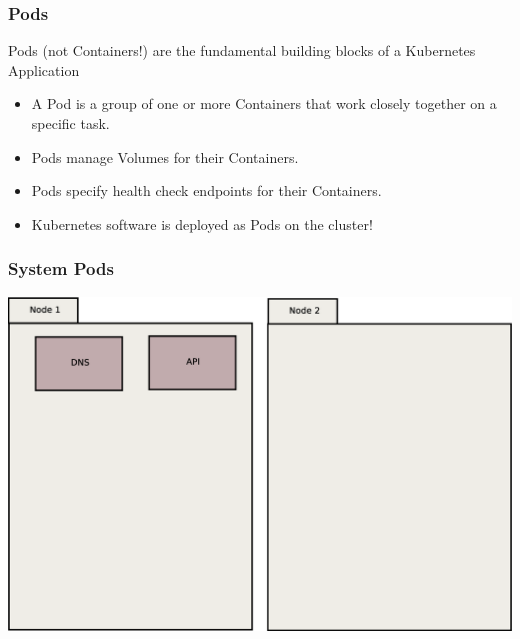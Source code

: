     \begin{frame}
        \frametitle{Pods}
        Pods (not Containers!) are the fundamental building blocks of a Kubernetes Application\pause
        \begin{itemize}
            \item A Pod is a group of one or more Containers that work closely together on a specific task.\pause
            \item Pods manage Volumes for their Containers.\pause
            \item Pods specify health check endpoints for their Containers.\pause
            \item Kubernetes software is deployed as Pods on the cluster!
        \end{itemize}
    \end{frame}

    \begin{frame}
        \frametitle{System Pods}
        \includegraphics[width=\textwidth,height=0.85\textheight,keepaspectratio]{graphics/01-systemPods.eps}
    \end{frame}

